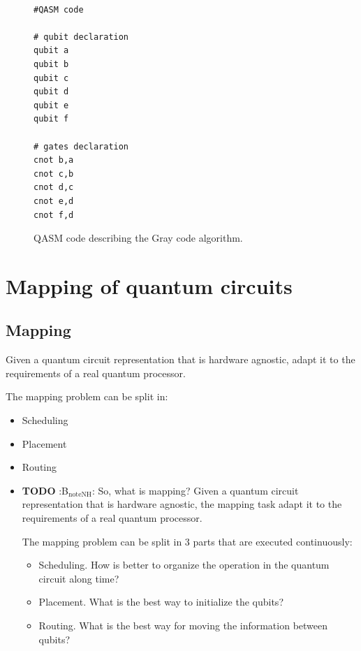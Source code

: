 \begin{figure}
\centering
\begin{minipage}{.45\textwidth}

\begin{verbatim}

#QASM code

# qubit declaration
qubit a
qubit b
qubit c
qubit d
qubit e
qubit f

# gates declaration
cnot b,a
cnot c,b
cnot d,c
cnot e,d
cnot f,d

\end{verbatim}

\caption{QASM code describing the Gray code algorithm.}
\end{minipage}
\end{figure}

\section*{Mapping of quantum circuits}
\label{sec:orga71d555}

\subsection*{Mapping}
\label{sec:org719a74f}

Given a quantum circuit representation that is hardware agnostic, adapt it to the requirements of a real quantum processor.


The mapping problem can be split in:

\begin{itemize}
\item Scheduling
\item Placement
\item Routing
\end{itemize}

\begin{itemize}
\item {\bfseries\sffamily TODO} :B\(_{\text{noteNH}}\):
\label{sec:org81bf84f}
So, what is mapping?
Given a quantum circuit representation that is hardware agnostic, the mapping task adapt it to the requirements of a real quantum processor.

The mapping problem can be split in 3 parts that are executed continuously:

\begin{itemize}
\item Scheduling. How is better to organize the operation in the quantum circuit along time?
\item Placement. What is the best way to initialize the qubits?
\item Routing. What is the best way for moving the information between qubits?
\end{itemize}
\end{itemize}

